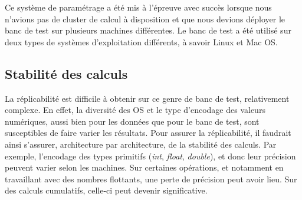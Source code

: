 Ce système de paramétrage a été mis à l'épreuve avec succès lorsque nous n'avions pas de cluster de calcul à disposition et que nous devions déployer le banc de test sur plusieurs machines différentes. Le banc de test a été utilisé sur deux types de systèmes d'exploitation différents, à savoir Linux et Mac OS.
\begin{table}[!t]
    \caption{Tableau récapitulant les propriétés de notre banc de test. Bien que reproductibles, certaines étapes nécessitent une modification manuelle en fonction des bases de données. Les * signifient que les résultats sont répétables dans le cas où l'on définit à l'avance les graines des générateurs aléatoires.}
    \label{ tab:reproductibility }
\end{table}

\subsection{Stabilité des calculs} 
La réplicabilité est difficile à obtenir sur ce genre de banc de test, relativement complexe. En effet, la diversité des OS et le type d'encodage des valeurs numériques, aussi bien pour les données que pour le banc de test, sont susceptibles de faire varier les résultats. Pour assurer la réplicabilité, il faudrait ainsi s'assurer, architecture par architecture, de la stabilité des calculs. Par exemple, l'encodage des types primitifs (\textit{int}, \textit{float}, \textit{double}), et donc leur précision peuvent varier selon les machines. Sur certaines opérations, et notamment en travaillant avec des nombres flottants, une perte de précision peut avoir lieu. Sur des calculs cumulatifs, celle-ci peut devenir significative.

